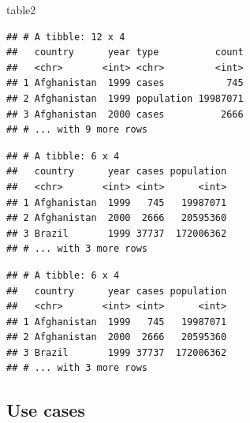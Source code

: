 \documentclass[]{book}
\newenvironment{Shaded}{}{}
\newcommand{\DataTypeTok}[1]{#1}
\newcommand{\KeywordTok}[1]{\textcolor[rgb]{0.00,0.00,1.00}{#1}}
\newcommand{\NormalTok}[1]{#1}
\newcommand{\OperatorTok}[1]{#1}
\newcommand{\StringTok}[1]{\textcolor[rgb]{0.00,0.50,0.50}{#1}}
\begin{document}
\begin{Shaded}
\begin{Highlighting}[]
\NormalTok{table2}
\end{Highlighting}
\end{Shaded}

\begin{verbatim}
## # A tibble: 12 x 4
##   country      year type          count
##   <chr>       <int> <chr>         <int>
## 1 Afghanistan  1999 cases           745
## 2 Afghanistan  1999 population 19987071
## 3 Afghanistan  2000 cases          2666
## # ... with 9 more rows
\end{verbatim}

\begin{Shaded}
\end{Shaded}

\begin{verbatim}
## # A tibble: 6 x 4
##   country      year cases population
##   <chr>       <int> <int>      <int>
## 1 Afghanistan  1999   745   19987071
## 2 Afghanistan  2000  2666   20595360
## 3 Brazil       1999 37737  172006362
## # ... with 3 more rows
\end{verbatim}

\begin{Shaded}
\end{Shaded}

\begin{verbatim}
## # A tibble: 6 x 4
##   country      year cases population
##   <chr>       <int> <int>      <int>
## 1 Afghanistan  1999   745   19987071
## 2 Afghanistan  2000  2666   20595360
## 3 Brazil       1999 37737  172006362
## # ... with 3 more rows
\end{verbatim}

\hypertarget{use-cases}{%
\subsection{Use cases}\label{use-cases}}
\end{document}
